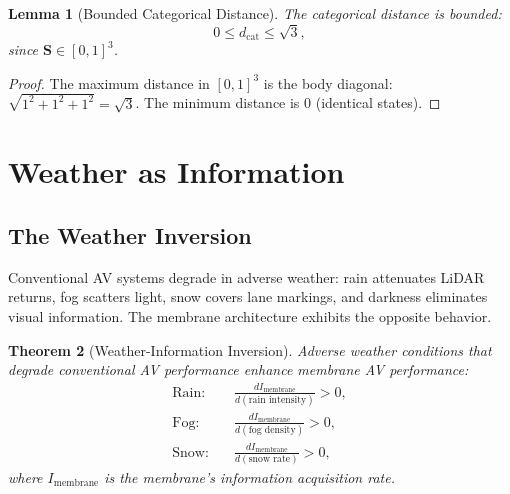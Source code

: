 \documentclass[twocolumn,10pt]{article}
\newtheorem{theorem}{Theorem}[section]
\newtheorem{lemma}[theorem]{Lemma}
\theoremstyle{definition}
\theoremstyle{remark}
\newcommand{\dcat}{d_{\mathrm{cat}}}
\begin{document}
\begin{lemma}[Bounded Categorical Distance]
\label{lem:bounded_distance}
The categorical distance is bounded:
\begin{equation}
  0 \leq \dcat \leq \sqrt{3},
  \label{eq:bounded_distance}
\end{equation}
since $\mathbf{S} \in [0,1]^3$.
\end{lemma}

\begin{proof}
The maximum distance in $[0,1]^3$ is the body diagonal: $\sqrt{1^2 + 1^2 + 1^2} = \sqrt{3}$. The minimum distance is 0 (identical states).
\end{proof}


\section{Weather as Information}
\label{sec:weather}

\subsection{The Weather Inversion}

Conventional AV systems degrade in adverse weather: rain attenuates LiDAR returns, fog scatters light, snow covers lane markings, and darkness eliminates visual information. The membrane architecture exhibits the opposite behavior.

\begin{theorem}[Weather-Information Inversion]
\label{thm:weather_inversion}
Adverse weather conditions that degrade conventional AV performance enhance membrane AV performance:
\begin{align}
  \text{Rain:} &\quad \frac{dI_{\mathrm{membrane}}}{d(\text{rain intensity})} > 0, \label{eq:rain} \\
  \text{Fog:} &\quad \frac{dI_{\mathrm{membrane}}}{d(\text{fog density})} > 0, \label{eq:fog} \\
  \text{Snow:} &\quad \frac{dI_{\mathrm{membrane}}}{d(\text{snow rate})} > 0, \label{eq:snow}
\end{align}
where $I_{\mathrm{membrane}}$ is the membrane's information acquisition rate.
\end{theorem}
\end{document}
